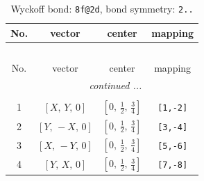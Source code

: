 \documentclass[fleqn,8pt]{jsarticle}
\begin{document}
\renewcommand{\arraystretch}{1.2}
\begin{longtable}{cccc}
\caption{Wyckoff bond: {\tt 8f@2d}, bond symmetry: {\tt 2..}}
 \\
 \hline \hline
No. & vector & center & mapping \\ \hline \endfirsthead

\multicolumn{3}{l}{\tablename\ \thetable{}} \\
 \hline \hline
No. & vector & center & mapping \\ \hline \endhead

 \hline \hline
\multicolumn{3}{r}{\footnotesize\it continued ...} \\ \endfoot

 \hline \hline
\multicolumn{3}{r}{} \\ \endlastfoot

1 & $\left[ X,\, Y,\, 0 \right]$ & $\left[ 0,\, \frac{1}{2},\, \frac{3}{4} \right]$ & {\tt [1,-2]} \\ \hline
2 & $\left[ Y,\, - X,\, 0 \right]$ & $\left[ 0,\, \frac{1}{2},\, \frac{3}{4} \right]$ & {\tt [3,-4]} \\ \hline
3 & $\left[ X,\, - Y,\, 0 \right]$ & $\left[ 0,\, \frac{1}{2},\, \frac{3}{4} \right]$ & {\tt [5,-6]} \\ \hline
4 & $\left[ Y,\, X,\, 0 \right]$ & $\left[ 0,\, \frac{1}{2},\, \frac{3}{4} \right]$ & {\tt [7,-8]} \\
\end{longtable}
\renewcommand{\arraystretch}{1.2}
\end{document}
